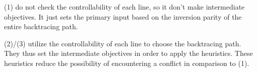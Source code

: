
(1) do not check the controllability of each line, so it don't make intermediate objectives. It just sets the primary input based on the inversion parity of the entire backtracing path.

(2)/(3) utilize the controllability of each line to choose the backtracing path. They thus set the intermediate objectives in order to apply the heuristics. These heuristics reduce the possibility of encountering a conflict in comparison to (1).
